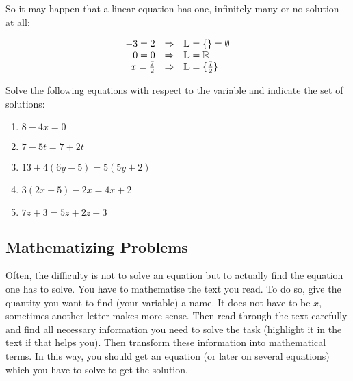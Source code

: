 So it may happen that a linear equation has one, infinitely many or no solution at all:

\[
\begin{array} {rcl}
-3=2 &\Rightarrow& \mathbb{L}=\{\}=\emptyset \\
0=0 &\Rightarrow& \mathbb{L}=\mathbb{R} \\
x=\frac{7}{2} &\Rightarrow& \mathbb{L}=\{\frac{7}{2}\}
\end{array}
\]





\begin{exer}
Solve the following equations with respect to the variable and indicate the set of solutions:
\begin{enumerate}[label=\emph{\alph*})]

\item $8 - 4x = 0$
\vfill

\item $7 - 5t = 7 + 2t$
\vfill

\item $13 + 4 ( 6y -5) = 5 (5y + 2)$
\vfill

\item $3(2x+5)-2x=4x+2$
\vfill

\item $7z+3=5z+2z+3$
\vfill 

\end{enumerate}
\end{exer}

\newpage
\subsection{Mathematizing Problems}
Often, the difficulty is not to solve an equation but to actually find the equation one has to solve. You have to mathematise the text you read. To do so, give the quantity you want to find (your variable) a name. It does not have to be $x$, sometimes another letter makes more sense. Then read through the text carefully and find all necessary information you need to solve the task (highlight it in the text if that helps you). Then transform these information into mathematical terms. In this way, you should get an equation (or later on several equations) which you have to solve to get the solution.

